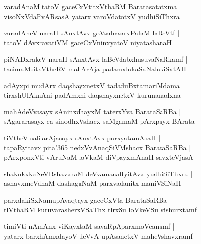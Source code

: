 \documentclass[twoside,12pt,openright]{book}
\newcounter{shloka}[chapter]
\begin{document}
\begin{shloka}
varadAnaM tatoV gaceCxVtitxVthaRM Baratasatatxma |\\
visoNxVdaRvARsasA yatarx varoVdatotxV yudhiSiThxra
\end{shloka}

\begin{shloka}
varadAneV naraH sAnxtAvx goVsahasarxPalaM laBeVtf |\\
tatoV dAvxravatiVM gaceCxVninxyatoV niyatashanaH 
\end{shloka}

\begin{shloka}
piNADxrakeV naraH sAnxtAvx laBeVdabxhusuvaNaRkamf |\\
tasimxMsitxVtheRV mahArAja padamxlakaSxNalakiSxtAH 
\end{shloka}

\begin{shloka}
adAyxpi mudArx daqshayxnetxV tadaduBxtamariMdama |\\
tirxshUlAknAni padAmxni daqshayxnetxV kurunanadxna 
\end{shloka}

\begin{shloka}
mahAdeVvasayx sAninxdhayxM taterxYva BarataSaRBa |\\
sAgararasayx ca sinodhxVshacx saMgamaM pArxpayx BArata
\end{shloka}

\begin{shloka}
tiVtheV salilarAjasayx sAnxtAvx parxyatamAsaH |\\
tapaRyitavx pita\char'365  nedxVvAnaqSiVMshacx BarataSaRBa |\\
pArxponxVti vAruNaM loVkaM diVpayxmAnaH savxteVjasA
\end{shloka}

\begin{shloka}
shaknkxkaNeVRshavxraM deVvamacaRyitAvx yudhiSiThxra |\\
ashavxmeVdhaM dashaguNaM parxvadanitx maniVSiNaH
\end{shloka}

\begin{shloka}
parxdakiSxNamupAvaqtayx gaceCxVta BarataSaRBa |\\
tiVthaRM kuruvarasherxVSaThx tirxSu loVkeVSu vishurxtamf 
\end{shloka}

\begin{shloka}
timiVti nAmAnx viKayxtaM savaRpAparxmoVcanamf |\\
yatarx barxhAmxdayoV deVvA upAsanetxV maheVshavxramf 
\end{shloka}
\end{document}
